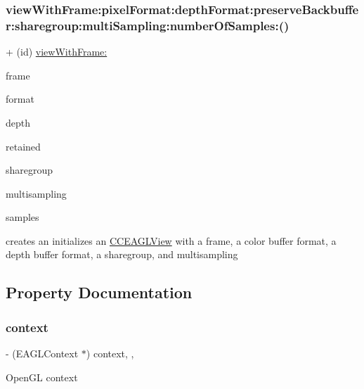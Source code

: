 \subsubsection{\texorpdfstring{view\+With\+Frame\+:pixel\+Format\+:depth\+Format\+:preserve\+Backbuffer\+:sharegroup\+:multi\+Sampling\+:number\+Of\+Samples\+:()}{viewWithFrame:pixelFormat:depthFormat:preserveBackbuffer:sharegroup:multiSampling:numberOfSamples:()}\hspace{0.1cm}{\footnotesize\ttfamily [2/2]}}
{\footnotesize\ttfamily + (id) \hyperlink{interfaceCCEAGLView_a288ea52be7dd891bbc9e0ee7e18cdf24}{view\+With\+Frame\+:} \begin{DoxyParamCaption}\item[{(C\+G\+Rect)}]{frame }\item[{pixelFormat:(N\+S\+String $\ast$)}]{format }\item[{depthFormat:(G\+Luint)}]{depth }\item[{preserveBackbuffer:(B\+O\+OL)}]{retained }\item[{sharegroup:(E\+A\+G\+L\+Sharegroup $\ast$)}]{sharegroup }\item[{multiSampling:(B\+O\+OL)}]{multisampling }\item[{numberOfSamples:(unsigned int)}]{samples }\end{DoxyParamCaption}}

creates an initializes an \hyperlink{interfaceCCEAGLView}{C\+C\+E\+A\+G\+L\+View} with a frame, a color buffer format, a depth buffer format, a sharegroup, and multisampling 

\subsection{Property Documentation}
\mbox{\label{interfaceCCEAGLView_ab45ef8d7ee501ddf5ac4e1ab7a8d3400}} 
\subsubsection{\texorpdfstring{context}{context}}
{\footnotesize\ttfamily -\/ (E\+A\+G\+L\+Context $\ast$) context\hspace{0.3cm}{\ttfamily [read]}, {\ttfamily [nonatomic]}, {\ttfamily [assign]}}

Open\+GL context \mbox{\label{interfaceCCEAGLView_a01c8d2218db6f275e4f56859062bd6ce}} 
